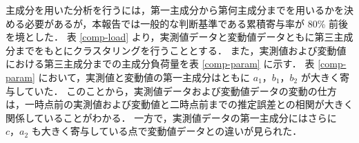 \documentclass[technicalreport]{ieicej}
\begin{document}
主成分を用いた分析を行うには，第一主成分から第何主成分までを用いるかを決める必要があるが，本報告では一般的な判断基準である累積寄与率が 80\% 前後を境とした．
表 \ref{comp-load} より，実測値データと変動値データともに第三主成分までをもとにクラスタリングを行うこととする．
また，実測値および変動値における第三主成分までの主成分負荷量を表 \ref{comp-param} に示す．
表 \ref{comp-param} において，実測値と変動値の第一主成分はともに $a_1$，$b_1$，$b_2$ が大きく寄与していた．
このことから，実測値データおよび変動値データの変動の仕方は，一時点前の実測値および変動値と二時点前までの推定誤差との相関が大きく関係していることがわかる．
一方で，実測値データの第一主成分にはさらに $c，a_2$ も大きく寄与している点で変動値データとの違いが見られた．
\begin{table}[tb]
\begin{center}
\caption{主成分負荷量}
\label{comp-param}
~
\end{center}
\end{table}
\end{document}
